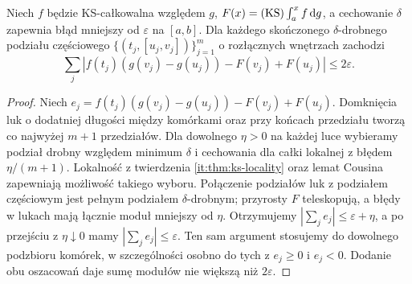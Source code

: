 \begin{lemat}\label{it:lem:ks-saks-henstock}
Niech $f$ będzie KS-całkowalna względem $g$,
$F(x)=(\mathrm{KS})\int_a^x f\,\mathrm dg$, a cechowanie $\delta$
zapewnia błąd mniejszy od $\varepsilon$ na $[a,b]$.
Dla każdego skończonego $\delta$-drobnego podziału
częściowego $\{(t_j,[u_j,v_j])\}_{j=1}^m$ o rozłącznych
wnętrzach zachodzi
\[
 \sum_j|f(t_j)(g(v_j)-g(u_j))-F(v_j)+F(u_j)|
 \le 2\varepsilon.
\]
\end{lemat}
\begin{proof}
Niech $e_j=f(t_j)(g(v_j)-g(u_j))-F(v_j)+F(u_j)$.
Domknięcia luk o dodatniej długości między komórkami
oraz przy końcach przedziału tworzą co najwyżej $m+1$
przedziałów. Dla dowolnego $\eta>0$ na każdej luce
wybieramy podział drobny względem minimum $\delta$ i
cechowania dla całki lokalnej z błędem $\eta/(m+1)$.
Lokalność z twierdzenia \ref{it:thm:ks-locality} oraz
lemat Cousina zapewniają możliwość takiego wyboru.
Połączenie podziałów luk z podziałem częściowym jest
pełnym podziałem $\delta$-drobnym; przyrosty $F$ teleskopują,
a błędy w lukach mają łącznie moduł mniejszy od $\eta$.
Otrzymujemy $|\sum_j e_j|\le\varepsilon+\eta$,
a po przejściu z $\eta\downarrow0$ mamy
$|\sum_j e_j|\le\varepsilon$.
Ten sam argument stosujemy do dowolnego podzbioru komórek,
w szczególności osobno do tych z $e_j\ge0$ i $e_j<0$.
Dodanie obu oszacowań daje sumę modułów nie większą niż
$2\varepsilon$.
\end{proof}

